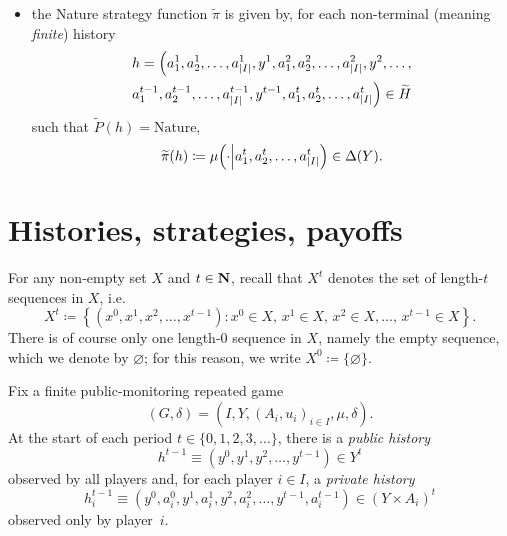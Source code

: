 \begin{remark}
\begin{itemize}
		\item the Nature strategy function $\widetilde{\pi}$ is given by, for each non-terminal (meaning \emph{finite}) history
		\begin{multline*}
			h = \Bigl(
			a_1^1,a_2^1,\dots,a_{\abs*{I}}^1,y^1,
			a_1^2,a_2^2,\dots,a_{\abs*{I}}^2,y^2,\dots,\\
			a_1^{t-1},a_2^{t-1},\dots,a_{\abs*{I}}^{t-1},y^{t-1},
			a_1^t,a_2^t,\dots,a_{\abs*{I}}^t\Bigr) \in \widetilde{H} 
		\end{multline*}
		such that $\widetilde{P}(h)=\text{Nature}$,
		\begin{equation*}
			\widetilde{\pi}(h) \coloneqq \mu\left(\cdot\middle|a_1^t,a_2^t,\dots,a_{\abs*{I}}^t\right) \in \Delta(Y) .
		\end{equation*}

	\end{itemize}
\end{remark}




\section{Histories, strategies, payoffs}
\label{aps:hist}

For any non-empty set $X$ and $t \in \mathbf{N}$, recall that $X^t$ denotes the set of length-$t$ sequences in $X$, i.e.
%
\begin{equation*}
	X^t
	\coloneqq \left\{ \left( x^0, x^1, x^2, \dots, x^{t-1} \right) : x^0 \in X,\, x^1 \in X,\, x^2 \in X, \dots,\, x^{t-1} \in X \right\} .
\end{equation*}
%
There is of course only one length-$0$ sequence in $X$, namely the empty sequence, which we denote by $\varnothing$; for this reason, we write $X^0 \coloneqq \{\varnothing\}$.

Fix a finite public-monitoring repeated game
%
\begin{equation*}
	(G,\delta) = \left( I, Y, (A_i, u_i)_{i \in I}, \mu, \delta \right) .
\end{equation*}
%
At the start of each period $t \in \{0,1,2,3,\dots\}$, there is a \emph{public history}
%
\begin{equation*}
	h^{t-1} \equiv \left(y^0,y^1,y^2,\dots,y^{t-1}\right) \in Y^t
\end{equation*}
%
observed by all players and, for each player $i \in I$, a \emph{private history}
%
\begin{equation*}
	h^{t-1}_i \equiv \left(y^0,a^0_i,y^1,a^1_i,y^2,a^2_i,\dots,y^{t-1},a^{t-1}_i\right) \in (Y \times A_i)^t
\end{equation*}
%
observed only by player~$i$.

